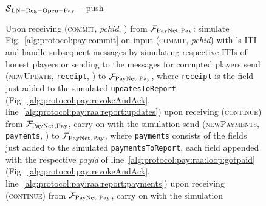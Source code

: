 \begin{figure}[!htbp]
\begin{simulatorbox}{$\mathcal{S}{}_{\mathrm{LN - Reg - Open - Pay}}$ -- push}
\begin{algorithmic}[1]
      \State Upon receiving (\textsc{commit}, \textit{pchid}, \alice) from
      $\mathcal{F}_{\mathrm{PayNet}}{}_{\mathrm{, Pay}}$:
      \Indent
        \State simulate Fig.~\ref{alg:protocol:pay:commit} on input
        (\textsc{commit}, \textit{pchid}) with \alice's ITI and handle
        subsequent messages by simulating respective ITIs of honest players or
        sending to \adversary{} the messages for corrupted players
        \label{alg:sim:push:commit}
          \State send (\textsc{newUpdate}, \texttt{receipt}, \alice) to
          $\mathcal{F}_{\mathrm{PayNet}}{}_{\mathrm{, Pay}}$, where \texttt{receipt} is the
          field just added to the simulated \texttt{updatesToReport}
          (Fig.~\ref{alg:protocol:pay:revokeAndAck},
          line~\ref{alg:protocol:pay:raa:report:updates})
          \label{alg:sim:push:report:updates}
          \State upon receiving (\textsc{continue}) from $\mathcal{F}_{\mathrm{PayNet}}{}_{\mathrm{,
          Pay}}$, carry on with the simulation
        \EndIf
        \label{alg:sim:push:report:payments:if}
          \State send (\textsc{newPayments}, \texttt{payments}, \alice) to
          $\mathcal{F}_{\mathrm{PayNet}}{}_{\mathrm{, Pay}}$, where \texttt{payments} consists of the
          fields just added to the simulated \texttt{paymentsToReport}, each
          field appended with the respective \textit{payid} of
          line~\ref{alg:protocol:pay:raa:loop:gotpaid}
          (Fig.~\ref{alg:protocol:pay:revokeAndAck},
          line~\ref{alg:protocol:pay:raa:report:payments})
          \label{alg:sim:push:report:payments}
          \State upon receiving (\textsc{continue}) from $\mathcal{F}_{\mathrm{PayNet}}{}_{\mathrm{,
          Pay}}$, carry on with the simulation
        \EndIf
      \EndIndent
    \end{algorithmic}
  \end{simulatorbox}
  \caption{}
  \label{alg:sim:push}
\end{figure}

